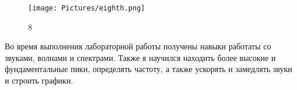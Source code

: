 \documentclass[10pt,a4paper,oneside]{article}
\begin{document}
\begin{figure}[H]
        \centering
        \texttt{[image: Pictures/eighth.png]}
        \caption{8}
        \label{fig:eight}
\end{figure}
Во время выполнения лабораторной работы получены навыки работаты со звуками, волнами и спектрами. Также я научился находить более высокие и фундаментальные пики, определять частоту, а также ускорять и замедлять звуки и строить графики.
\end{document}
